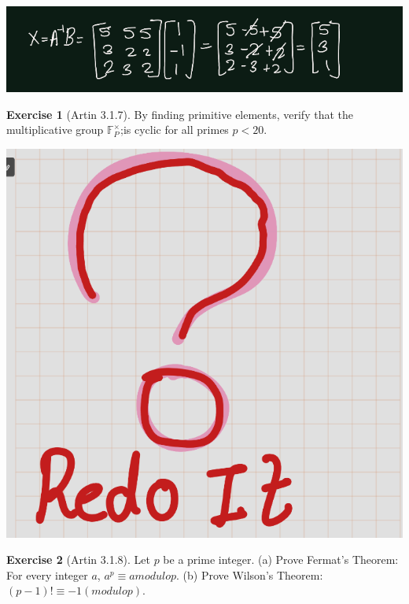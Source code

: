 \documentclass[
]{book}
\theoremstyle{definition}
\theoremstyle{definition}
\theoremstyle{definition}
\newtheorem{exercise}{Exercise}[chapter]
\theoremstyle{definition}
\theoremstyle{remark}
\begin{document}
\includegraphics{figures/ch_3/ex-1.6-5.png}

\begin{exercise}[Artin 3.1.7]
\protect\hypertarget{exr:unnamed-chunk-263}{}\label{exr:unnamed-chunk-263}By finding primitive elements, verify that the multiplicative group \(\mathbb{F}_P^\times\);is cyclic for all primes \(p < 20\).
\end{exercise}

\includegraphics{figures/ch_2/fig100.png}

\begin{exercise}[Artin 3.1.8]
\protect\hypertarget{exr:unnamed-chunk-265}{}\label{exr:unnamed-chunk-265}Let \(p\) be a prime integer.
(a) Prove Fermat's Theorem: For every integer \(a\), \(a^p \equiv a modulo p\).
(b) Prove Wilson's Theorem: \((p -1)!\equiv -1(modulo p)\).
\end{exercise}
\end{document}
